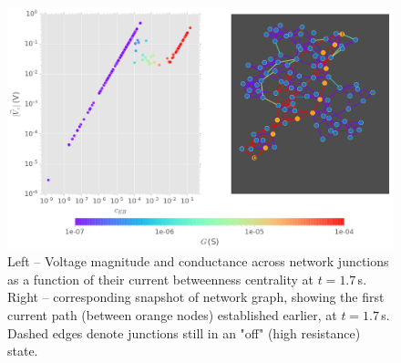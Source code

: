 \documentclass[fleqn,10pt,  reprint, amsmath,amssymb,aps, floatfix]{wlscirep}
\begin{document}
\begin{figure}[h]
	\centering
	\includegraphics[width=0.8\linewidth]{figure/ebc+nw}
	\caption{Left -- Voltage magnitude and conductance across network junctions as a function of their current betweenness centrality at $t = 1.7\,$s. Right -- corresponding snapshot of network graph, showing the first current path (between orange nodes) established earlier, at $t = 1.7\,$s. Dashed edges denote junctions still in an "off" (high resistance) state.}
	\label{fig:ebc+nw}
\end{figure}





\end{document}
